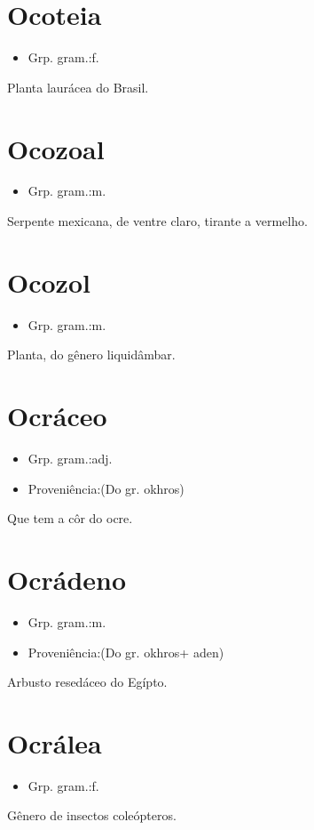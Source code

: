 \section{Ocoteia}
\begin{itemize}
\item {Grp. gram.:f.}
\end{itemize}
Planta laurácea do Brasil.
\section{Ocozoal}
\begin{itemize}
\item {Grp. gram.:m.}
\end{itemize}
Serpente mexicana, de ventre claro, tirante a vermelho.
\section{Ocozol}
\begin{itemize}
\item {Grp. gram.:m.}
\end{itemize}
Planta, do gênero liquidâmbar.
\section{Ocráceo}
\begin{itemize}
\item {Grp. gram.:adj.}
\end{itemize}
\begin{itemize}
\item {Proveniência:(Do gr. \textunderscore okhros\textunderscore )}
\end{itemize}
Que tem a côr do ocre.
\section{Ocrádeno}
\begin{itemize}
\item {Grp. gram.:m.}
\end{itemize}
\begin{itemize}
\item {Proveniência:(Do gr. \textunderscore okhros\textunderscore  + \textunderscore aden\textunderscore )}
\end{itemize}
Arbusto resedáceo do Egípto.
\section{Ocrálea}
\begin{itemize}
\item {Grp. gram.:f.}
\end{itemize}
Gênero de insectos coleópteros.
